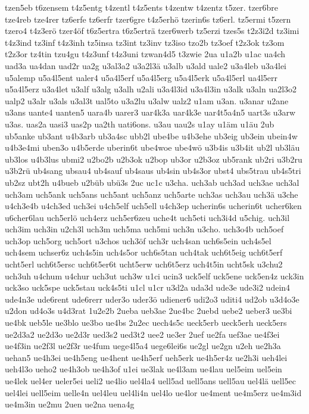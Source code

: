 {tzen5eb
t6zensem
t4z5entg
t4zentl
t4z5ents
t4zentw
t4zentz
t5zer.
tzer6bre
tze4reb
tze4rer
tz6erfe
tz6erfr
tzer6gre
t4z5erhö
tzerin6s
tz6erl.
tz5ermi
t5zern
tzero4
t4z3erö
tzer4öf
t6z5ertra
t6z5erträ
tzer6werb
tz5erzi
tzes5s
t2z3i2d
tz3imi
t4z3ind
tz3inf
t4z3inh
tz5insa
tz3int
tz3inv
tz3iso
tzo2b
tz3oef
t2z3ok
tz3om
t2z3or
tz4tin
tzu4gu
t4z3unf
t4z3uni
tzwan4d5
t3zwie
2ua
u1a2b
u1ac
ua4ch
uad3a
ua4dan
uad2r
ua2g
u3al3a2
u3a2l3ä
u3alb
u3ald
uale2
u3a4leb
u3a4lei
u5alemp
u5a4l5ent
ualer4
u5a4l5erf
u5a4l5erg
u5a4l5erk
u5a4l5erl
ua4l5err
u5a4l5erz
u3a4let
u3alf
u3alg
u3alh
u2ali
u3a4l3id
u3a4l3in
u3alk
u3aln
ua2l3o2
ualp2
u3alr
u3als
u3al3t
ual5to
u3a2lu
u3alw
ualz2
u1am
u3an.
u3anar
u2ane
u3ans
uante4
uanten5
uara4b
uarer3
uar4k3a
uar4k3e
uar4t5a4n5
uart3s
u3arw
u3as.
uas2a
uasi3
uas2p
ua2th
uati6ons.
u3au
uau2s
u1ay
u1äm
u1äu
2ub
ub5anke
ub3ant
u4b3arb
ub3a4sc
ubb2l
ube4be
u4b3ehe
ub3eig
ub3ein
ubein4w
u4b3e4mi
uben3o
u4b5erde
uberin6t
ube4woe
ube4wö
u3b4is
u3b4it
ub2l
ub3läu
ub3los
u4b3lus
ubmi2
u2bo2b
u2b3ok
u2bop
ub3or
u2b3oz
ub5rank
ub2ri
u3b2ru
u3b2rü
ub4sang
ubsau4
ub4sauf
ub4saus
ub4sin
ub4s3or
ubst4
ubs5trau
ub4s5tri
ub2sz
ubt2h
u4bueb
u2büb
ubü3s
2uc
uc1c
u3cha.
uch3ab
uch3ad
uch3ae
uch3al
uch3am
uch5ank
uch5ans
uch5ant
uch5anz
uch5arte
uch3as
uch3au
uch3ä
u3che
u4ch3e4b
u4ch3ed
uch3ei
u4ch5elf
uch5ell
u4ch3ep
ucherin6s
ucherin6t
ucher6ken
u6cher6lau
uch5erlö
uch4erz
uch5er6zeu
uche4t
uch5eti
uch3i4d
u5chig.
uch3il
uch3im
uch3in
u2ch3l
uch3m
uch5ma
uch5mi
uch3n
u3cho.
uch3o4b
uch5oef
uch3op
uch5org
uch5ort
u3chos
uch3öf
uch3r
uch4san
uch6s5ein
uch4s5el
uch4sem
uchser6z
uch4s5in
uch4s5or
uch6s5tan
uch4tak
uch6t5eig
uch6t5erf
ucht5erl
uch6t5ersc
uch6t5er6t
ucht5erw
uch6t5erz
uch4t5in
ucht5sk
u3chu2
uch3uh
u4chum
u4chur
uch3ut
uch3w
u1ci
ucin3
uck5elf
uck5ene
uck5en4z
uck3in
uck3so
uck5spe
uck5stau
uck4s5ti
u1cl
u1cr
u3d2a
uda3d
ude3e
ude3i2
udein4
ude4n3e
ude6rent
ude6rerr
uder3o
uder3ö
udiener6
udi2o3
uditi4
ud2ob
u3d4o3e
u2don
ud4o3s
u4d3rat
1u2e2b
2ueba
ueb3ae
2ue4bc
2uebd
uebe2
ueber3
ue3bi
ue4bk
ueb5le
ue3blo
ue3bo
ue4bs
2u2ec
uech4s5c
ueck5erb
ueck5erh
ueck5ers
ue2d3a2
ue2d3o
ue2d3r
ued3s2
ued3t2
uee2
ue3er
2uef
ue2fa
uef3ae
ue4f3ei
ue4f3in
ue2f3l
ue2f3r
ue4fum
uege4l5a4
uege6lei6s
ue2gl
ue2gn
u2eh
ue2h3a
uehan5
ue4h3ei
ue4h5eng
ue4hent
ue4h5erf
ueh5erk
ue4h5er4z
ue2h3i
ueh4lei
ueh4l3o
ueho2
ue4h3ob
ue4h3of
u1ei
ue3lak
ue4l3am
ue4lau
uel5eim
uel5ein
ue4lek
uel4er
ueler5ei
ueli2
ue4lio
uel4la4
uell5ad
uell5ans
uell5au
uel4lä
uell5ec
uel4lei
uell5eim
uelle4n
uel4leu
uel4li4n
uel4lo
ue4lor
ue4ment
ue4m5erz
ue4m3id
ue4m3in
ue2mu
2uen
ue2na
uena4g
}
